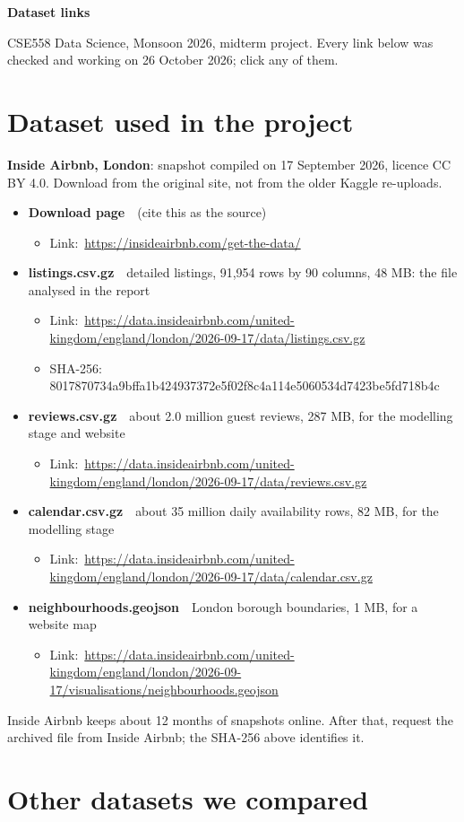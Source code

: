 \documentclass[11pt,a4paper]{article}
\newcommand{\data}[3]{\item \textbf{#1}\ \ {\color{muted}#2}\par\nopagebreak
  \begin{itemize}[leftmargin=0.9em, itemsep=1pt, topsep=1pt, label={}]#3\end{itemize}}
\newcommand{\lnk}[2]{\item #1:\ \url{#2}}
\begin{document}
{\LARGE\bfseries Dataset links\par}
\vspace{3pt}
{\color{muted}CSE558 Data Science, Monsoon 2026, midterm project.
Every link below was checked and working on 26 October 2026; click any of them.\par}

\section{Dataset used in the project}

\textbf{Inside Airbnb, London}: snapshot compiled on 17 September 2026, licence CC BY 4.0.
Download from the original site, not from the older Kaggle re-uploads.

\begin{itemize}
\data{Download page}{(cite this as the source)}{%
  \lnk{Link}{https://insideairbnb.com/get-the-data/}}
\data{listings.csv.gz}{detailed listings, 91,954 rows by 90 columns, 48 MB: the file analysed in the report}{%
  \lnk{Link}{https://data.insideairbnb.com/united-kingdom/england/london/2026-09-17/data/listings.csv.gz}%
  \item SHA-256: {\small 8017870734a9bffa1b424937372e5f02f8c4a114e5060534d7423be5fd718b4c}}
\data{reviews.csv.gz}{about 2.0 million guest reviews, 287 MB, for the modelling stage and website}{%
  \lnk{Link}{https://data.insideairbnb.com/united-kingdom/england/london/2026-09-17/data/reviews.csv.gz}}
\data{calendar.csv.gz}{about 35 million daily availability rows, 82 MB, for the modelling stage}{%
  \lnk{Link}{https://data.insideairbnb.com/united-kingdom/england/london/2026-09-17/data/calendar.csv.gz}}
\data{neighbourhoods.geojson}{London borough boundaries, 1 MB, for a website map}{%
  \lnk{Link}{https://data.insideairbnb.com/united-kingdom/england/london/2026-09-17/visualisations/neighbourhoods.geojson}}
\end{itemize}

{\color{muted}Inside Airbnb keeps about 12 months of snapshots online. After that, request the
archived file from Inside Airbnb; the SHA-256 above identifies it.\par}

\section{Other datasets we compared}
\end{document}
